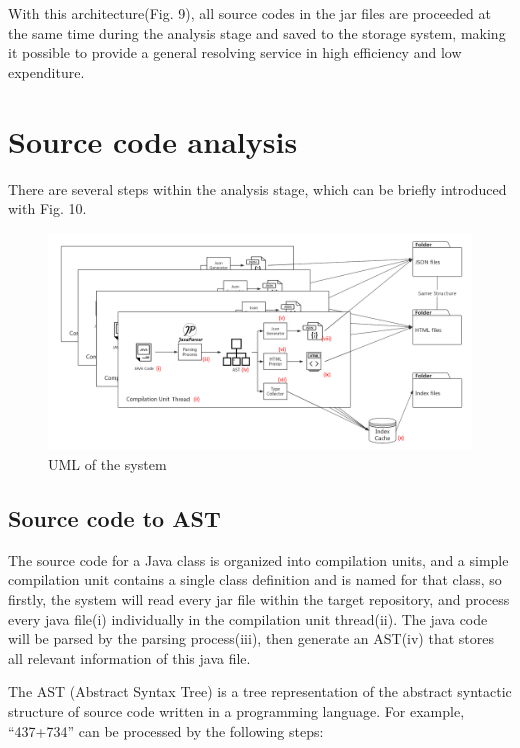 \documentclass[runningheads]{llncs}
\begin{document}
With this architecture(Fig. 9), all source codes in the jar files are proceeded at the same time during the analysis stage and saved to the storage system, making it possible to provide a general resolving service in high efficiency and low expenditure.

\section{Source code analysis}

There are several steps within the analysis stage, which can be briefly introduced with Fig. 10.

\begin{figure}[H]
	\centering
	\includegraphics[width=12cm]{pic/AnalysisFlow.png}
	\caption{UML of the system}
	\label{Source code analysis process}
\end{figure}

\subsection{Source code to AST}

The source code for a Java class is organized into compilation units, and a simple compilation unit contains a single class definition and is named for that class\cite{learningJava_2013}, so firstly, the system will read every jar file within the target repository, and process every java file(i) individually in the compilation unit thread(ii). The java code will be parsed by the parsing process(iii), then generate an AST(iv) that stores all relevant information of this java file.

The AST (Abstract Syntax Tree) is a tree representation of the abstract syntactic structure of source code written in a programming language.\cite{AST_introduction} For example, “437+734” can be processed by the following steps:
\end{document}
